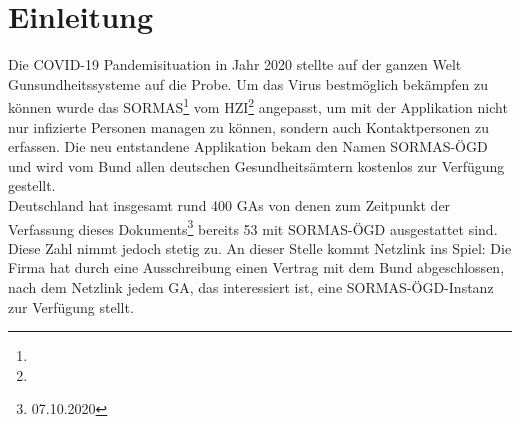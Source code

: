\chapter{Einleitung}

Die \ac{COVID-19} Pandemisituation in Jahr 2020 stellte auf der ganzen Welt Gunsundheitssysteme auf die Probe. 
Um das Virus bestmöglich bekämpfen zu können wurde das \ac{SORMAS}\footnote{} vom \ac{HZI}\footnote{} angepasst, um mit der Applikation nicht nur infizierte Personen managen zu können, sondern auch Kontaktpersonen zu erfassen.
Die neu entstandene Applikation bekam den Namen \ac{SORMAS-ÖGD} und wird vom Bund allen deutschen Gesundheitsämtern kostenlos zur Verfügung gestellt. 
\cite{SORMAS_covid}
\\
Deutschland hat insgesamt rund 400 \ac{GAs} \cite{GAs} von denen zum Zeitpunkt der Verfassung dieses Dokuments\footnote{07.10.2020} bereits 53 mit \ac{SORMAS-ÖGD} ausgestattet sind.
Diese Zahl nimmt jedoch stetig zu.  
An dieser Stelle kommt Netzlink ins Spiel: 
Die Firma hat durch eine Ausschreibung einen Vertrag mit dem Bund abgeschlossen, nach dem Netzlink jedem \ac{GA}, das interessiert ist, eine \ac{SORMAS-ÖGD}-Instanz zur Verfügung stellt.

